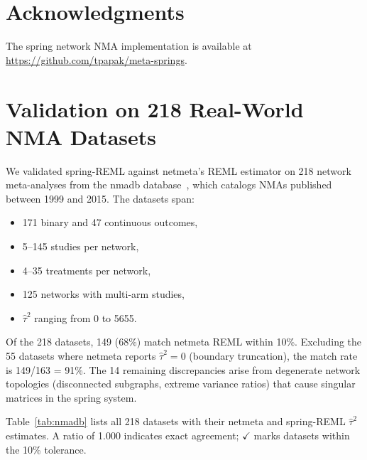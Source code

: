 \documentclass[12pt]{article}
\begin{document}
\section*{Acknowledgments}

The spring network NMA implementation is available at
\url{https://github.com/tpapak/meta-springs}.





\appendix

\section{Validation on 218 Real-World NMA Datasets}\label{app:nmadb}

We validated spring-REML against netmeta's REML estimator on 218
network meta-analyses from the nmadb database~\citep{Petropoulou2016},
which catalogs NMAs published between 1999 and 2015.  The datasets span:
\begin{itemize}
  \item 171 binary and 47 continuous outcomes,
  \item 5--145 studies per network,
  \item 4--35 treatments per network,
  \item 125 networks with multi-arm studies,
  \item $\hat\tau^2$ ranging from 0 to 5655.
\end{itemize}

Of the 218 datasets, 149 (68\%) match netmeta REML within 10\%.
Excluding the 55 datasets where netmeta reports $\hat\tau^2 = 0$
(boundary truncation), the match rate is 149/163 = 91\%.
The 14 remaining discrepancies arise from degenerate network topologies
(disconnected subgraphs, extreme variance ratios) that cause singular
matrices in the spring system.

Table~\ref{tab:nmadb} lists all 218 datasets with their netmeta and
spring-REML $\hat\tau^2$ estimates.  A ratio of 1.000 indicates exact
agreement; $\checkmark$ marks datasets within the 10\% tolerance.

\begingroup
\footnotesize

\endgroup
\end{document}
